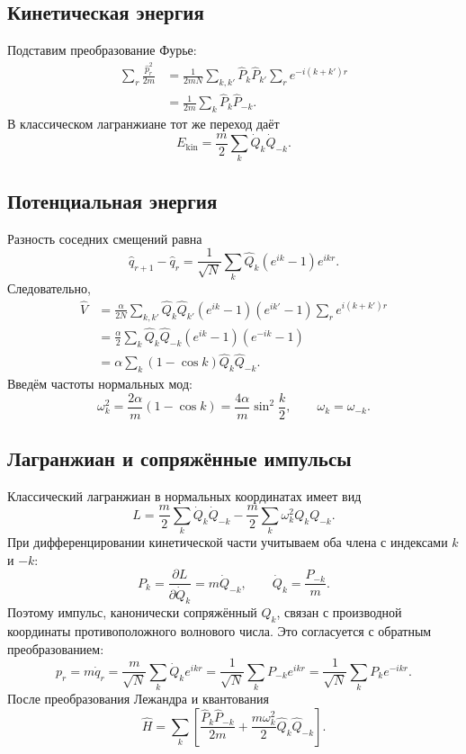 \documentclass[../final.tex]{subfiles}
\begin{document}
\subsection*{Кинетическая энергия}

Подставим преобразование Фурье:
\begin{align*}
    \sum_r\frac{\hat p_r^2}{2m}
       &=\frac1{2mN}\sum_{k,k'}\hat P_k\hat P_{k'}
           \sum_r e^{-i(k+k')r}\\
       &=\frac1{2m}\sum_k\hat P_k\hat P_{-k}.
\end{align*}
В классическом лагранжиане тот же переход даёт
\[
    E_{\mathrm{kin}}=\frac m2\sum_k\dot Q_k\dot Q_{-k}.
\]

\subsection*{Потенциальная энергия}

Разность соседних смещений равна
\[
    \hat q_{r+1}-\hat q_r
       =\frac1{\sqrt N}\sum_k\hat Q_k(e^{ik}-1)e^{ikr}.
\]
Следовательно,
\begin{align*}
    \hat V&=\frac\alpha{2N}\sum_{k,k'}
       \hat Q_k\hat Q_{k'}(e^{ik}-1)(e^{ik'}-1)
       \sum_r e^{i(k+k')r}\\
       &=\frac\alpha2\sum_k\hat Q_k\hat Q_{-k}
           (e^{ik}-1)(e^{-ik}-1)\\
       &=\alpha\sum_k(1-\cos k)\hat Q_k\hat Q_{-k}.
\end{align*}
Введём частоты нормальных мод:
\[
    \omega_k^2=\frac{2\alpha}{m}(1-\cos k)
       =\frac{4\alpha}{m}\sin^2\frac k2,
    \qquad \omega_k=\omega_{-k}.
\]

\subsection*{Лагранжиан и сопряжённые импульсы}

Классический лагранжиан в нормальных координатах имеет вид
\[
    L=\frac m2\sum_k\dot Q_k\dot Q_{-k}
       -\frac m2\sum_k\omega_k^2Q_kQ_{-k}.
\]
При дифференцировании кинетической части учитываем оба члена
с индексами $k$ и $-k$:
\[
    P_k=\frac{\partial L}{\partial\dot Q_k}=m\dot Q_{-k},
    \qquad \dot Q_k=\frac{P_{-k}}m.
\]
Поэтому импульс, канонически сопряжённый $Q_k$, связан
с производной координаты противоположного волнового числа.
Это согласуется с обратным преобразованием:
\[
    p_r=m\dot q_r
       =\frac m{\sqrt N}\sum_k\dot Q_ke^{ikr}
       =\frac1{\sqrt N}\sum_k P_{-k}e^{ikr}
       =\frac1{\sqrt N}\sum_k P_ke^{-ikr}.
\]
После преобразования Лежандра и квантования
\[
    \hat H=\sum_k\left[
       \frac{\hat P_k\hat P_{-k}}{2m}
       +\frac{m\omega_k^2}{2}\hat Q_k\hat Q_{-k}\right].
\]
\end{document}
